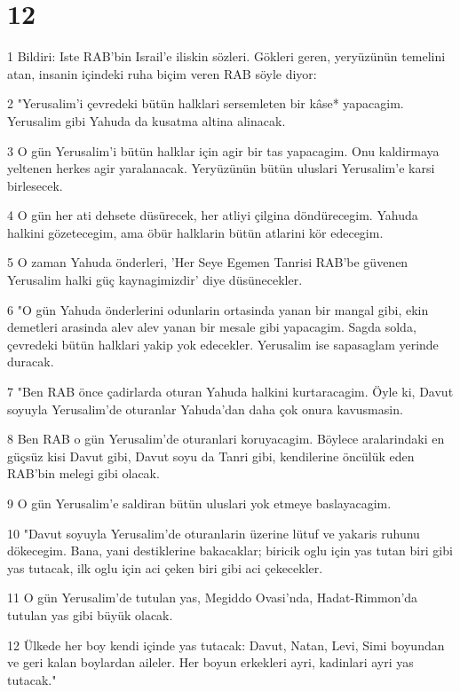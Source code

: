 \chapter{12}

\par 1 Bildiri: Iste RAB'bin Israil'e iliskin sözleri. Gökleri geren, yeryüzünün temelini atan, insanin içindeki ruha biçim veren RAB söyle diyor:
\par 2 "Yerusalim'i çevredeki bütün halklari sersemleten bir kâse* yapacagim. Yerusalim gibi Yahuda da kusatma altina alinacak.
\par 3 O gün Yerusalim'i bütün halklar için agir bir tas yapacagim. Onu kaldirmaya yeltenen herkes agir yaralanacak. Yeryüzünün bütün uluslari Yerusalim'e karsi birlesecek.
\par 4 O gün her ati dehsete düsürecek, her atliyi çilgina döndürecegim. Yahuda halkini gözetecegim, ama öbür halklarin bütün atlarini kör edecegim.
\par 5 O zaman Yahuda önderleri, 'Her Seye Egemen Tanrisi RAB'be güvenen Yerusalim halki güç kaynagimizdir' diye düsünecekler.
\par 6 "O gün Yahuda önderlerini odunlarin ortasinda yanan bir mangal gibi, ekin demetleri arasinda alev alev yanan bir mesale gibi yapacagim. Sagda solda, çevredeki bütün halklari yakip yok edecekler. Yerusalim ise sapasaglam yerinde duracak.
\par 7 "Ben RAB önce çadirlarda oturan Yahuda halkini kurtaracagim. Öyle ki, Davut soyuyla Yerusalim'de oturanlar Yahuda'dan daha çok onura kavusmasin.
\par 8 Ben RAB o gün Yerusalim'de oturanlari koruyacagim. Böylece aralarindaki en güçsüz kisi Davut gibi, Davut soyu da Tanri gibi, kendilerine öncülük eden RAB'bin melegi gibi olacak.
\par 9 O gün Yerusalim'e saldiran bütün uluslari yok etmeye baslayacagim.
\par 10 "Davut soyuyla Yerusalim'de oturanlarin üzerine lütuf ve yakaris ruhunu dökecegim. Bana, yani destiklerine bakacaklar; biricik oglu için yas tutan biri gibi yas tutacak, ilk oglu için aci çeken biri gibi aci çekecekler.
\par 11 O gün Yerusalim'de tutulan yas, Megiddo Ovasi'nda, Hadat-Rimmon'da tutulan yas gibi büyük olacak.
\par 12 Ülkede her boy kendi içinde yas tutacak: Davut, Natan, Levi, Simi boyundan ve geri kalan boylardan aileler. Her boyun erkekleri ayri, kadinlari ayri yas tutacak."

